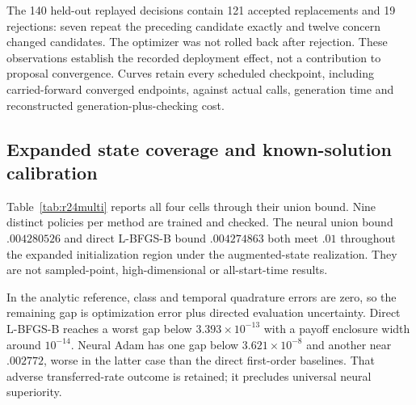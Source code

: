 The 140 held-out replayed decisions contain 121 accepted replacements and 19 rejections: seven repeat the preceding candidate exactly and twelve concern changed candidates. The optimizer was not rolled back after rejection. These observations establish the recorded deployment effect, not a contribution to proposal convergence. Curves retain every scheduled checkpoint, including carried-forward converged endpoints, against actual calls, generation time and reconstructed generation-plus-checking cost.

\subsection{Expanded state coverage and known-solution calibration}
Table~\ref{tab:r24multi} reports all four cells through their union bound. Nine distinct policies per method are trained and checked. The neural union bound $.004280526$ and direct L-BFGS-B bound $.004274863$ both meet $.01$ throughout the expanded initialization region under the augmented-state realization. They are not sampled-point, high-dimensional or all-start-time results.

In the analytic reference, class and temporal quadrature errors are zero, so the remaining gap is optimization error plus directed evaluation uncertainty. Direct L-BFGS-B reaches a worst gap below $3.393\times10^{-13}$ with a payoff enclosure width around $10^{-14}$. Neural Adam has one gap below $3.621\times10^{-8}$ and another near $.002772$, worse in the latter case than the direct first-order baselines. That adverse transferred-rate outcome is retained; it precludes universal neural superiority.


